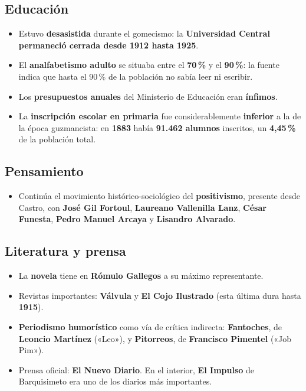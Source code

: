 \documentclass[12pt, letterpaper]{article}
\begin{document}
\subsection*{Educación}
\begin{itemize}[leftmargin=*, itemsep=3pt]
  \item Estuvo \textbf{desasistida} durante el gomecismo: la \textbf{Universidad
        Central permaneció cerrada desde 1912 hasta 1925}.
  \item El \textbf{analfabetismo adulto} se situaba entre el \textbf{70\,\%} y
        el \textbf{90\,\%}: la fuente indica que hasta el 90\,\% de la población
        no sabía leer ni escribir.
  \item Los \textbf{presupuestos anuales} del Ministerio de Educación eran
        \textbf{ínfimos}.
  \item La \textbf{inscripción escolar en primaria} fue considerablemente
        \textbf{inferior} a la de la época guzmancista: en \textbf{1883} había
        \textbf{91.462 alumnos} inscritos, un \textbf{4,45\,\%} de la población
        total.
\end{itemize}

\subsection*{Pensamiento}
\begin{itemize}[leftmargin=*, itemsep=3pt]
  \item Continúa el movimiento histórico-sociológico del \textbf{positivismo},
        presente desde Castro, con \textbf{José Gil Fortoul}, \textbf{Laureano
        Vallenilla Lanz}, \textbf{César Funesta}, \textbf{Pedro Manuel Arcaya} y
        \textbf{Lisandro Alvarado}.
\end{itemize}

\subsection*{Literatura y prensa}
\begin{itemize}[leftmargin=*, itemsep=3pt]
  \item La \textbf{novela} tiene en \textbf{Rómulo Gallegos} a su máximo
        representante.
  \item Revistas importantes: \textbf{Válvula} y \textbf{El Cojo Ilustrado}
        (esta última dura hasta \textbf{1915}).
  \item \textbf{Periodismo humorístico} como vía de crítica indirecta:
        \textbf{Fantoches}, de \textbf{Leoncio Martínez} («Leo»), y
        \textbf{Pitorreos}, de \textbf{Francisco Pimentel} («Job Pim»).
  \item Prensa oficial: \textbf{El Nuevo Diario}. En el interior,
        \textbf{El Impulso} de Barquisimeto era uno de los diarios más
        importantes.
\end{itemize}
\end{document}
